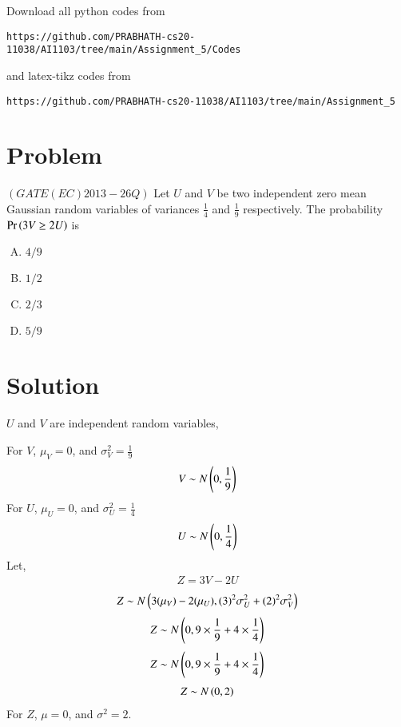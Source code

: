 \documentclass[journal,12pt,twocolumn]{IEEEtran}
\begin{document}
Download all python codes from 
\begin{lstlisting}
https://github.com/PRABHATH-cs20-11038/AI1103/tree/main/Assignment_5/Codes
\end{lstlisting}

and latex-tikz codes from
\begin{lstlisting}
https://github.com/PRABHATH-cs20-11038/AI1103/tree/main/Assignment_5
\end{lstlisting}

\section{Problem}

$(GATE(EC)2013-26Q)$ Let $U$ and $V$ be two independent zero mean Gaussian random variables of variances $\frac{1}{4}$ and $\frac{1}{9}$ respectively. The probability $\Pr\left(3V\geq2U \right)$ is

\begin{enumerate}[(A)]
    \item $4/9$
    \item $1/2$
    \item $2/3$
    \item $5/9$
\end{enumerate}

\section{Solution}

$U$ and $V$ are independent random variables,

For $V$, $\mu_V=0$, and $\sigma_V^2=\frac{1}{9}$
\begin{align}
    V\sim N\left(0,\frac{1}{9}\right)
\end{align}
For $U$, $\mu_U=0$, and $\sigma_U^2=\frac{1}{4}$
\begin{align}
    U\sim N\left(0,\frac{1}{4}\right)
\end{align}
Let,
\begin{align}
    Z=3V-2U
\end{align}
\begin{align}
    Z\sim N\left(3(\mu_V)-2(\mu_U), (3)^2\sigma_U^2+(2)^2\sigma_V^2\right)
\end{align}
\begin{align}
    Z\sim N\left(0,9\times\frac{1}{9}+4\times\frac{1}{4}\right)
\end{align}
\begin{align}
    Z\sim N\left(0,9\times\frac{1}{9}+4\times\frac{1}{4}\right)
\end{align}
\begin{align}
    Z\sim N\left(0,2\right)
\end{align}
For $Z$, $\mu=0$, and $\sigma^2=2$.
\end{document}
